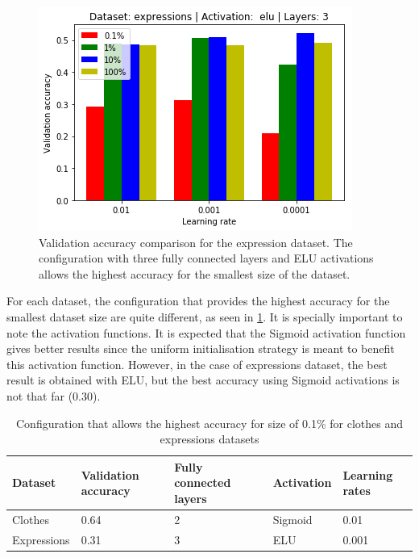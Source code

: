 \documentclass{article}
\begin{document}
\begin{figure}[tb]
    \vskip 5mm
        \begin{center}
            \includegraphics[scale=0.5]{accuracy_reduction_01.png}
            \caption{Validation accuracy comparison for the expression dataset. The configuration with three fully connected layers and ELU activations allows the highest accuracy for the smallest size of the dataset.}
            \label{fig:tf_exp}
        \end{center}
    \vskip -5mm
\end{figure}

For each dataset, the configuration that provides the highest accuracy for the smallest dataset size are quite different, as seen in \ref{tab:tf_1}. It is specially important to note the activation functions. It is expected that the Sigmoid activation function gives better results since the uniform initialisation strategy is meant to benefit this activation function. However, in the case of expressions dataset, the best result is obtained with ELU, but the best accuracy using Sigmoid activations is not that far (0.30).

\begin{table}[!htb]
  \centering
  \begin{tabular}{| l | l | l | l | l |}
    \hline
    \textbf{Dataset} & \textbf{Validation accuracy} & \textbf{Fully connected layers}& \textbf{Activation} & \textbf{Learning rates}\\ \hline
    Clothes & 0.64 & 2 & Sigmoid & 0.01 \\ \hline
    Expressions & 0.31  & 3 & ELU & 0.001 \\ \hline
  \end{tabular}
  \caption{Configuration that allows the highest accuracy for size of 0.1\% for clothes and expressions datasets}
  \label{tab:tf_1}
\end{table}
\end{document}
